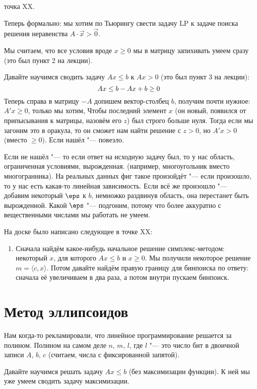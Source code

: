 	\TODO точка XX.

	Теперь формально: мы хотим по Тьюрингу свести задачу LP к задаче поиска решения неравенства $A \cdot \vec x > \vec 0$.

	Мы считаем, что все условия вроде $x \ge 0$ мы в матрицу запихивать умеем сразу (это был пункт 2 на лекции).

	Давайте научимся сводить задачу $A x \le b$ к $A x > 0$ (это был пункт 3 на лекции):
	\[
		A x \le b \\
		-Ax + b \ge 0
	\]
	Теперь справа в матрицу $-A$ допишем вектор-столбец $b$, получим почти нужное: $A' x \ge 0$,
	только мы хотим, Чтобы последний элемент $x$ (он новый, появился от припысывания к матрицы,
	назовём его $z$) был строго больше нуля.
	Тогда если мы загоним это в оракула, то он сможет нам найти решение с $z > 0$, но $A' x > 0$
	(вместо $\ge 0$).
	Если нашёл "--- повезло.

	Если не нашёл "--- то если ответ на исходную задачу был, то у нас область, ограниченная условиями, вырожденная.
	(например, многоугольник вместо многогранника).
	На реальных данных фиг такое произойдёт "--- если произошло, то у нас есть какая-то линейная зависимость.
	Если всё же произошло "--- добавим некоторый $\eps$ к $b$, немножко раздвинув область, она
	перестанет быть вырожденной.
	Какой $\eps$ "--- подгоним, потому что более аккуратно с вещественными числами мы работать не умеем.


	На доске было написано следующее в точке XX:
	\begin{enumerate}
		\item
			Сначала найдём какое-нибудь начальное решение симплекс-методом: некоторый $x$, для которого $A x \le b$ и $x \ge 0$.
			Мы получили некоторое решение $m = \langle c, x \rangle$.
			Потом давайте найдём правую границу для бинпоиска по ответу: сначала её увеличиваем в два раза,
			а потом внутри пускаем бинпоиск.
	\end{enumerate}

\section{Метод эллипсоидов}
	Нам когда-то рекламировали, что линейное программирование решается за полином.
	Полином на самом деле $n$, $m$, $l$, где $l$ "--- это число бит в двоичной записи $A$, $b$, $c$
	(считаем, числа с фиксированной запятой).

	Давайте научимся решать задачу $A x \le b$ (без максимизации функции).
	К ней мы уже умеем сводить задачу максимизации.

